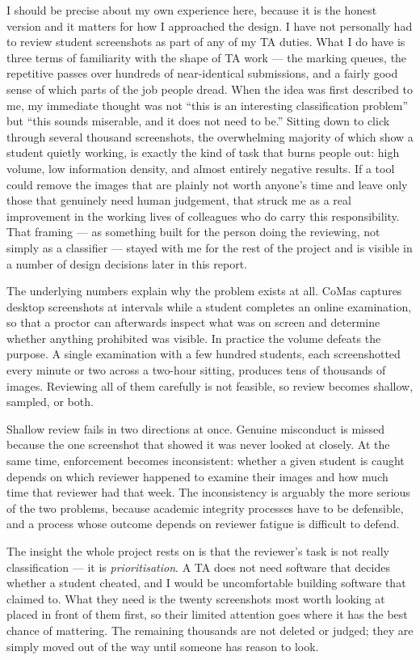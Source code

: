 \documentclass[12pt,oneside]{report}
\begin{document}
I should be precise about my own experience here, because it is the honest
version and it matters for how I approached the design. I have not personally
had to review student screenshots as part of any of my TA duties. What I do
have is three terms of familiarity with the shape of TA work --- the marking
queues, the repetitive passes over hundreds of near-identical submissions, and
a fairly good sense of which parts of the job people dread. When the idea was
first described to me, my immediate thought was not ``this is an interesting
classification problem'' but ``this sounds miserable, and it does not need to
be.'' Sitting down to click through several thousand screenshots, the
overwhelming majority of which show a student quietly working, is exactly the
kind of task that burns people out: high volume, low information density, and
almost entirely negative results. If a tool could remove the images that are
plainly not worth anyone's time and leave only those that genuinely need human
judgement, that struck me as a real improvement in the working lives of
colleagues who do carry this responsibility. That framing --- as something
built for the person doing the reviewing, not simply as a classifier ---
stayed with me for the rest of the project and is visible in a number of design
decisions later in this report.

The underlying numbers explain why the problem exists at all. CoMas captures
desktop screenshots at intervals while a student completes an online
examination, so that a proctor can afterwards inspect what was on screen and
determine whether anything prohibited was visible. In practice the volume
defeats the purpose. A single examination with a few hundred students, each
screenshotted every minute or two across a two-hour sitting, produces tens of
thousands of images. Reviewing all of them carefully is not feasible, so review
becomes shallow, sampled, or both.

Shallow review fails in two directions at once. Genuine misconduct is missed
because the one screenshot that showed it was never looked at closely. At the
same time, enforcement becomes inconsistent: whether a given student is caught
depends on which reviewer happened to examine their images and how much time
that reviewer had that week. The inconsistency is arguably the more serious of
the two problems, because academic integrity processes have to be defensible,
and a process whose outcome depends on reviewer fatigue is difficult to
defend.

The insight the whole project rests on is that the reviewer's task is not
really classification --- it is \emph{prioritisation}. A TA does not need
software that decides whether a student cheated, and I would be uncomfortable
building software that claimed to. What they need is the twenty screenshots
most worth looking at placed in front of them first, so their limited attention
goes where it has the best chance of mattering. The remaining thousands are not
deleted or judged; they are simply moved out of the way until someone has
reason to look.
\end{document}
